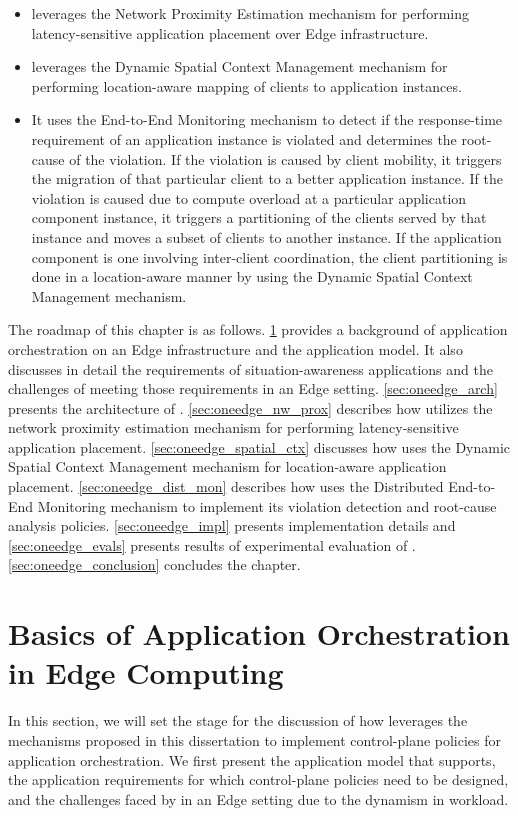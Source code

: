 \begin{itemize}
\item \oneedge{} leverages the Network Proximity Estimation mechanism for performing latency-sensitive application placement over Edge infrastructure. 
\item \oneedge{} leverages the Dynamic Spatial Context Management mechanism for performing location-aware mapping of clients to application instances. 
\item It uses the End-to-End Monitoring mechanism to detect if the response-time requirement of an application instance is violated and determines the root-cause of the violation. If the violation is caused by client mobility, it triggers the migration of that particular client to a better application instance. If the violation is caused due to compute overload at a particular application component instance, it triggers a partitioning of the clients served by that instance and moves a subset of clients to another instance. If the application component is one involving inter-client coordination, the client partitioning is done in a location-aware manner by using the Dynamic Spatial Context Management mechanism.
\end{itemize}
 The roadmap of this chapter is as follows. \cref{sec:oneedge_background} provides a background of application orchestration on an Edge infrastructure and the application model. It also discusses in detail the requirements of situation-awareness applications and the challenges of meeting those requirements in an Edge setting. \cref{sec:oneedge_arch} presents the architecture of \oneedge{}. \cref{sec:oneedge_nw_prox} describes how \oneedge{} utilizes the network proximity estimation mechanism for performing latency-sensitive application placement. \cref{sec:oneedge_spatial_ctx} discusses how \oneedge{} uses  the Dynamic Spatial Context Management mechanism for location-aware application placement. \cref{sec:oneedge_dist_mon} describes how \oneedge{} uses the Distributed End-to-End Monitoring mechanism to implement its violation detection and root-cause analysis policies. \cref{sec:oneedge_impl} presents implementation details and \cref{sec:oneedge_evals} presents results of experimental evaluation of \oneedge{}. \cref{sec:oneedge_conclusion} concludes the chapter.



\section{Basics of Application Orchestration in Edge Computing}
\label{sec:oneedge_background}
In this section, we will set the stage for the discussion of how \oneedge{} leverages the mechanisms proposed in this dissertation to implement control-plane policies for application orchestration. We first present the application model that \oneedge{} supports, the application requirements for which control-plane policies need to be designed, and the challenges faced by in an Edge setting due to the dynamism in workload.

